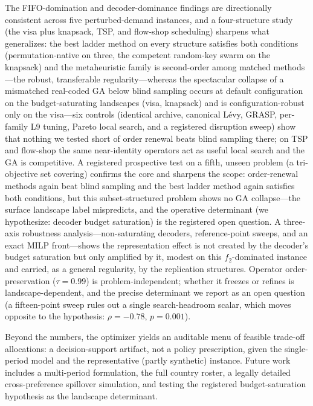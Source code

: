 \documentclass[runningheads]{llncs}
\begin{document}
The FIFO-domination and decoder-dominance findings are directionally consistent across five perturbed-demand instances, and a four-structure study (the visa plus knapsack, TSP, and flow-shop scheduling) sharpens what generalizes: the best ladder method on every structure satisfies both conditions (permutation-native on three, the competent random-key swarm on the knapsack) and the metaheuristic family is second-order among matched methods---the robust, transferable regularity---whereas the spectacular collapse of a mismatched real-coded GA below blind sampling occurs at default configuration on the budget-saturating landscapes (visa, knapsack) and is configuration-robust only on the visa---six controls (identical archive, canonical L\'evy, GRASP, per-family L9 tuning, Pareto local search, and a registered disruption sweep) show that nothing we tested short of order renewal beats blind sampling there; on TSP and flow-shop the same near-identity operators act as useful local search and the GA is competitive. A registered prospective test on a fifth, unseen problem (a tri-objective set covering) confirms the core and sharpens the scope: order-renewal methods again beat blind sampling and the best ladder method again satisfies both conditions, but this subset-structured problem shows no GA collapse---the surface landscape label mispredicts, and the operative determinant (we hypothesize: decoder budget saturation) is the registered open question. A three-axis robustness analysis---non-saturating decoders, reference-point sweeps, and an exact MILP front---shows the representation effect is not created by the decoder's budget saturation but only amplified by it, modest on this $f_2$-dominated instance and carried, as a general regularity, by the replication structures. Operator order-preservation ($\tau{=}0.99$) is problem-independent; whether it freezes or refines is landscape-dependent, and the precise determinant we report as an open question (a fifteen-point sweep rules out a single search-headroom scalar, which moves opposite to the hypothesis: $\rho=-0.78$, $p=0.001$).

Beyond the numbers, the optimizer yields an auditable menu of feasible trade-off allocations: a decision-support artifact, not a policy prescription, given the single-period model and the representative (partly synthetic) instance. Future work includes a multi-period formulation, the full country roster, a legally detailed cross-preference spillover simulation, and testing the registered budget-saturation hypothesis as the landscape determinant.
\end{document}
